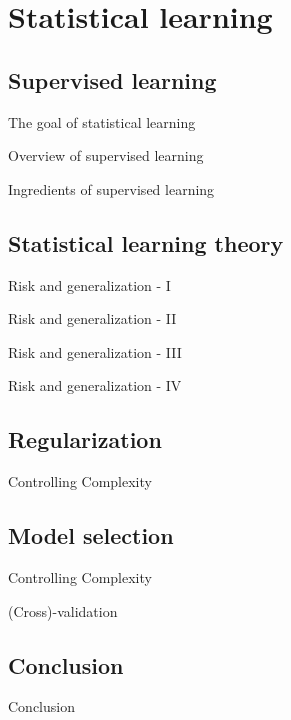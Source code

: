 
\section{Statistical learning}
\subsection{Supervised learning}
\begin{frame}[t]{The goal of statistical learning}

\end{frame}
\begin{frame}[t]{Overview of supervised learning}

\end{frame}
\begin{frame}[t]{Ingredients of supervised learning}

\end{frame}
\subsection{Statistical learning theory}
\begin{frame}[t]{Risk and generalization - I}

\end{frame}
\begin{frame}[t]{Risk and generalization - II}

\end{frame}
\begin{frame}[t]{Risk and generalization - III}

\end{frame}
\begin{frame}[t]{Risk and generalization - IV}

\end{frame}
\subsection{Regularization}
\begin{frame}[t]{Controlling Complexity}

\end{frame}

\subsection{Model selection}
\begin{frame}[t]{Controlling Complexity}

\end{frame}

\begin{frame}[t]{(Cross)-validation}

\end{frame}
\subsection{Conclusion}
\begin{frame}[t]{Conclusion}

\end{frame}